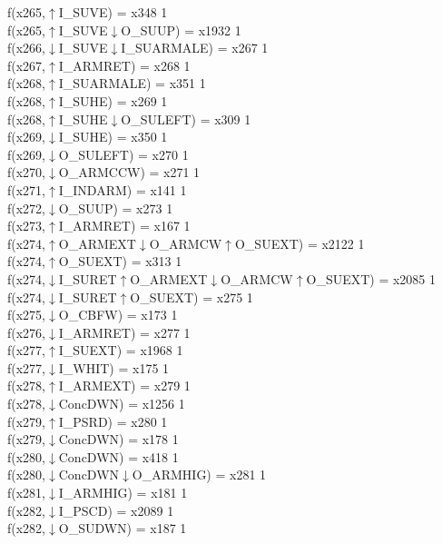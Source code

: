 f(x265,$\uparrow$I\_SUVE) = x348 {1} \\
f(x265,$\uparrow$I\_SUVE$\downarrow$O\_SUUP) = x1932 {1} \\
f(x266,$\downarrow$I\_SUVE$\downarrow$I\_SUARMALE) = x267 {1} \\
f(x267,$\uparrow$I\_ARMRET) = x268 {1} \\
f(x268,$\uparrow$I\_SUARMALE) = x351 {1} \\
f(x268,$\uparrow$I\_SUHE) = x269 {1} \\
f(x268,$\uparrow$I\_SUHE$\downarrow$O\_SULEFT) = x309 {1} \\
f(x269,$\downarrow$I\_SUHE) = x350 {1} \\
f(x269,$\downarrow$O\_SULEFT) = x270 {1} \\
f(x270,$\downarrow$O\_ARMCCW) = x271 {1} \\
f(x271,$\uparrow$I\_INDARM) = x141 {1} \\
f(x272,$\downarrow$O\_SUUP) = x273 {1} \\
f(x273,$\uparrow$I\_ARMRET) = x167 {1} \\
f(x274,$\uparrow$O\_ARMEXT$\downarrow$O\_ARMCW$\uparrow$O\_SUEXT) = x2122 {1} \\
f(x274,$\uparrow$O\_SUEXT) = x313 {1} \\
f(x274,$\downarrow$I\_SURET$\uparrow$O\_ARMEXT$\downarrow$O\_ARMCW$\uparrow$O\_SUEXT) = x2085 {1} \\
f(x274,$\downarrow$I\_SURET$\uparrow$O\_SUEXT) = x275 {1} \\
f(x275,$\downarrow$O\_CBFW) = x173 {1} \\
f(x276,$\downarrow$I\_ARMRET) = x277 {1} \\
f(x277,$\uparrow$I\_SUEXT) = x1968 {1} \\
f(x277,$\downarrow$I\_WHIT) = x175 {1} \\
f(x278,$\uparrow$I\_ARMEXT) = x279 {1} \\
f(x278,$\downarrow$ConcDWN) = x1256 {1} \\
f(x279,$\uparrow$I\_PSRD) = x280 {1} \\
f(x279,$\downarrow$ConcDWN) = x178 {1} \\
f(x280,$\downarrow$ConcDWN) = x418 {1} \\
f(x280,$\downarrow$ConcDWN$\downarrow$O\_ARMHIG) = x281 {1} \\
f(x281,$\downarrow$I\_ARMHIG) = x181 {1} \\
f(x282,$\downarrow$I\_PSCD) = x2089 {1} \\
f(x282,$\downarrow$O\_SUDWN) = x187 {1} \\
